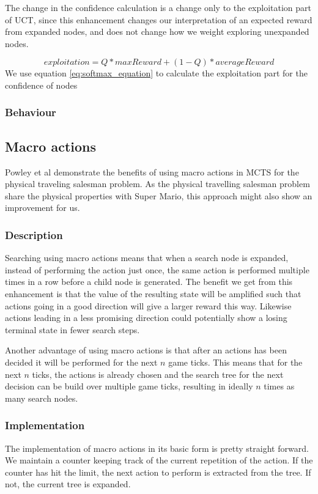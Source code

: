\documentclass[10pt,a4paper]{article}
\begin{document}
The change in the confidence calculation is a change only to the exploitation part of UCT, since this enhancement changes our interpretation of an expected reward from expanded nodes, and does not change how we weight exploring unexpanded nodes.

\begin{equation}\label{eq:softmax_equation}
exploitation = Q * maxReward + (1 - Q ) * averageReward
\end{equation}
We use equation \ref{eq:softmax_equation} to calculate the exploitation part for the confidence of nodes

\subsubsection{Behaviour}

\subsection{Macro actions}
\label{macro}
Powley et al demonstrate the benefits of using macro actions in MCTS for the physical traveling salesman problem\cite{salesman}. As the physical travelling salesman problem share the physical properties with Super Mario, this approach might also show an improvement for us.

\subsubsection{Description}
Searching using macro actions means that when a search node is expanded, instead of performing the action just once, the same action is performed multiple times in a row before a child node is generated.
The benefit we get from this enhancement is that the value of the resulting state will be amplified such that actions going in a good direction will give a larger reward this way. Likewise actions leading in a less promising direction could potentially show a losing terminal state in fewer search steps.

Another advantage of using macro actions is that after an actions has been decided it will be performed for the next $n$ game ticks. This means that for the next $n$ ticks, the actions is already chosen and the search tree for the next decision can be build over multiple game ticks, resulting in ideally $n$ times as many search nodes.

\subsubsection{Implementation} %
The implementation of macro actions in its basic form is pretty straight forward. We maintain a counter keeping track of the current repetition of the action. If the counter has hit the limit, the next action to perform is extracted from the tree. If not, the current tree is expanded.
\end{document}
